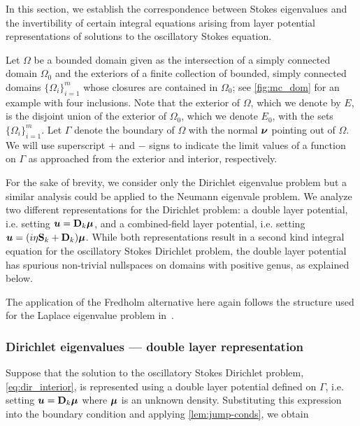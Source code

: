 In this section, we establish the correspondence between
Stokes eigenvalues and the invertibility of certain integral
equations arising from layer potential representations
of solutions to the oscillatory Stokes equation.

Let $\Omega$ be a bounded domain given as
the intersection of a simply connected domain $\Omega_0$ and
the exteriors of a finite collection of bounded,
simply connected domains $\{ \Omega_i \}_{i=1}^m$
whose closures are contained in $\Omega_0$;
see \cref{fig:mc_dom} for an example with four inclusions.
Note that the
exterior of $\Omega$, which we denote by $E$, is the
disjoint union of the exterior of $\Omega_0$, which we
denote $E_0$, with the sets $\{ \Omega_i \}_{i=1}^m$.
Let $\Gamma$ denote the boundary of $\Omega$ with the normal
${\boldsymbol \nu}$ pointing out of $\Omega$.
We will use superscript $+$ and $-$ signs
to indicate the limit values of a function on $\Gamma$
as approached from the exterior and interior, respectively.

For the sake of brevity, we consider only the
Dirichlet eigenvalue problem but a similar analysis
could be applied to the Neumann eigenvale problem.
We analyze two different representations for the
Dirichlet problem: a double layer potential,
i.e. setting ${\boldsymbol u}={\bf D}_{k} {\boldsymbol \mu}$, and a combined-field
layer potential, i.e. setting
${\boldsymbol u}=(i\eta {\bf S}_{k} + {\bf D}_{k}){\boldsymbol \mu}$. 
While both representations result in a second kind
integral equation for the oscillatory Stokes Dirichlet
problem, the double layer potential has spurious non-trivial
nullspaces on domains with positive genus, as
explained below.

\begin{remark}
  The application of the Fredholm alternative here
  again follows the structure used for the Laplace
  eigenvalue problem in~\cite[Ch. 3]{colton1983integral}.
\end{remark}


\subsubsection{Dirichlet eigenvalues --- double layer
  representation}
\label{subsec:dlanalysis}
Suppose that the solution to the oscillatory
Stokes Dirichlet problem, \cref{eq:dir_interior},
is represented using a double layer potential defined
on $\Gamma$, i.e. setting ${\boldsymbol u} = {\bf D}_{k} {\boldsymbol \mu}$ where
${\boldsymbol \mu}$ is an unknown density. 
Substituting this expression
into the boundary condition and applying
\cref{lem:jump-conds}, we obtain

